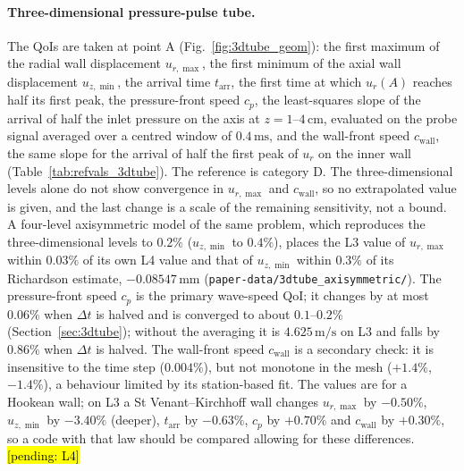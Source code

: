 \paragraph{Three-dimensional pressure-pulse tube.}
The QoIs are taken at point A (Fig.~\ref{fig:3dtube_geom}): the first maximum of the radial wall displacement $u_{r,\max}$, the first minimum of the axial wall displacement $u_{z,\min}$, the arrival time $t_\mathrm{arr}$, the first time at which $u_r(A)$ reaches half its first peak, the pressure-front speed $c_p$, the least-squares slope of the arrival of half the inlet pressure on the axis at $z = 1$--$4\,\mathrm{cm}$, evaluated on the probe signal averaged over a centred window of $0.4\,\mathrm{ms}$, and the wall-front speed $c_\mathrm{wall}$, the same slope for the arrival of half the first peak of $u_r$ on the inner wall (Table~\ref{tab:refvals_3dtube}).
The reference is category D. The three-dimensional levels alone do not show convergence in $u_{r,\max}$ and $c_\mathrm{wall}$, so no extrapolated value is given, and the last change is a scale of the remaining sensitivity, not a bound. A four-level axisymmetric model of the same problem, which reproduces the three-dimensional levels to $0.2\%$ ($u_{z,\min}$ to $0.4\%$), places the L3 value of $u_{r,\max}$ within $0.03\%$ of its own L4 value and that of $u_{z,\min}$ within $0.3\%$ of its Richardson estimate, $-0.08547\,\mathrm{mm}$ (\texttt{paper-data/3dtube\_axisymmetric/}). The pressure-front speed $c_p$ is the primary wave-speed QoI; it changes by at most $0.06\%$ when $\Delta t$ is halved and is converged to about $0.1$--$0.2\%$ (Section~\ref{sec:3dtube}); without the averaging it is $4.625\,\mathrm{m/s}$ on L3 and falls by $0.86\%$ when $\Delta t$ is halved. The wall-front speed $c_\mathrm{wall}$ is a secondary check: it is insensitive to the time step ($0.004\%$), but not monotone in the mesh ($+1.4\%$, $-1.4\%$), a behaviour limited by its station-based fit. The values are for a Hookean wall; on L3 a St Venant--Kirchhoff wall changes $u_{r,\max}$ by $-0.50\%$, $u_{z,\min}$ by $-3.40\%$ (deeper), $t_\mathrm{arr}$ by $-0.63\%$, $c_p$ by $+0.70\%$ and $c_\mathrm{wall}$ by $+0.30\%$, so a code with that law should be compared allowing for these differences. \hl{[pending: L4]}

